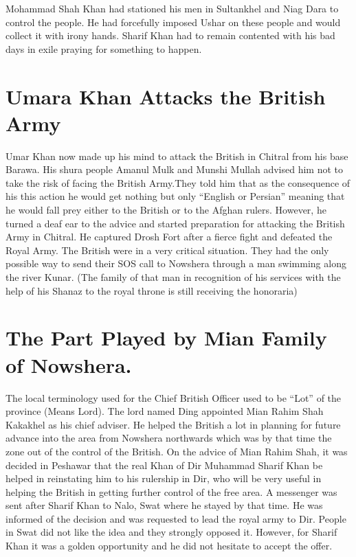 \documentclass[twoside,openright]{book}
\begin{document}
Mohammad Shah Khan had stationed his men in Sultankhel and Niag Dara to control
the people. He had forcefully imposed Ushar on these people and would collect it
with irony hands. Sharif Khan had to remain contented with his bad days in exile
praying for something to happen.

\section{Umara Khan Attacks the British Army}

Umar Khan now made up his mind to attack the British in
Chitral from his base Barawa. His shura people Amanul Mulk and
Munshi Mullah advised him not to take the risk of facing the
British Army.They told him that as the consequence of his this
action he would get nothing but only ``English or Persian'' meaning
that he would fall prey either to the British or to the Afghan
rulers. However, he turned a deaf ear to the advice and started
preparation for attacking the British Army in Chitral. He captured
Drosh Fort after a fierce fight and defeated the Royal Army. The
British were in a very critical situation. They had the only
possible way to send their SOS call to Nowshera through a man
swimming along the river Kunar. (The family of that man in
recognition of his services with the help of his Shanaz to the
royal throne is still receiving the honoraria)

\section{The Part Played by Mian Family of Nowshera.}

The local terminology used for the Chief British Officer used
to be ``Lot'' of the province (Means Lord). The lord named Ding
appointed Mian Rahim Shah Kakakhel as his chief adviser. He helped
the British a lot in planning for future advance into the area from
Nowshera northwards which was by that time the zone out of the
control of the British. On the advice of Mian Rahim Shah, it was
decided in Peshawar that the real Khan of Dir Muhammad Sharif Khan
be helped in reinstating him to his rulership in Dir, who will be
very useful in helping the British in getting further control of
the free area. A messenger was sent after Sharif Khan to Nalo,
Swat where he stayed by that time. He was informed of the decision
and was requested to lead the royal army to Dir. People in Swat
did not like the idea and they strongly opposed it. However, for
Sharif Khan it was a golden opportunity and he did not hesitate to
accept the offer.
\end{document}

